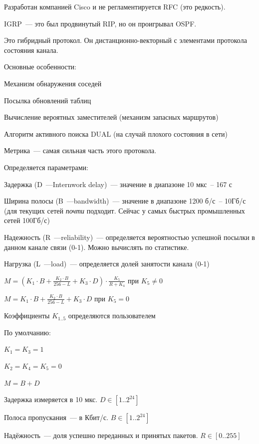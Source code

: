 Разработан компанией Cisco и не регламентируется RFC (это редкость).

IGRP~--- это был продвинутый RIP, но он проигрывал OSPF.

Это гибридный протокол. Он дистанционно-векторный с элементами протокола состояния канала.

Основные особенности:
\begin{MyItemize}
    \item Механизм обнаружения соседей
    \item Посылка обновлений таблиц
    \item Вычисление вероятных заместителей (механизм запасных маршрутов)
    \item Алгоритм активного поиска DUAL (на случай плохого состояния в сети)
\end{MyItemize}

Метрика~--- самая сильная часть этого протокола.

Определяется параметрами:
\begin{MyItemize}
    \item Задержка (D~---Internwork delay)~--- значение в диапазоне 10 мкс~-- 167 с
    \item Ширина полосы (B~---bandwidth)~--- значение в диапазоне 1200 б/с~-- 10Гб/с (для текущих сетей {\it почти} подходит. Сейчас у самых быстрых промышленных сетей 100Гб/с)
    \item Надежность (R~---reliability)~--- определяется вероятностью успешной посылки в данном канале связи (0-1). Можно вычислять по статистике.
    \item Нагрузка (L~---load)~--- определяется долей занятости канала (0-1)
\end{MyItemize}

$M=(K_1\cdot B + \frac{K_2\cdot B}{256-L} + K_3\cdot D)\cdot\frac{K_5}{R+K_4}$ при $K_5\neq 0$

$M=K_1\cdot B + \frac{K_2\cdot B}{256-L} + K_3\cdot D$ при $K_5= 0$

Коэффициенты $K_{1..5}$ определяются пользователем

По умолчанию:

$K_1=K_3=1$

$K_2=K_4=K_5=0$

$M=B+D$

Задержка измеряется в 10 мкс. $D\in[1..2^{24}]$

Полоса пропускания~--- в Кбит/с. $B\in[1..2^{24}]$

Надёжность~--- доля успешно переданных и принятых пакетов. $R\in[0..255]$

